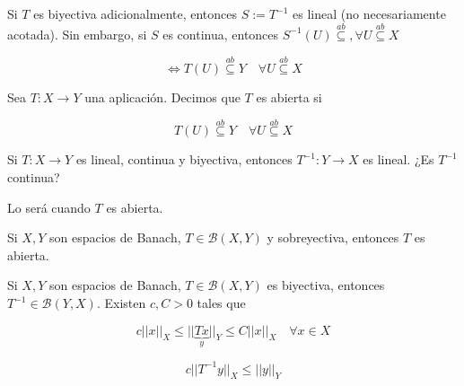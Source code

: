 Si $T$ es biyectiva adicionalmente, entonces $S:=T^{-1}$ es lineal (no necesariamente acotada).
Sin embargo, si $S$ es continua, entonces $S^{-1}(U)\overset{ab}{\subseteq},\forall U\overset{ab}{\subseteq}X$

\[\iff T(U)\overset{ab}{\subseteq}Y\quad \forall U\overset{ab}{\subseteq}X\]

\begin{fdefinition}
    Sea $T:X\to Y$ una aplicación. Decimos que $T$ es abierta si 
    
    \[T(U)\overset{ab}{\subseteq}Y\quad \forall U\overset{ab}{\subseteq}X\]
\end{fdefinition}

Si $T:X\to Y$ es lineal, continua y biyectiva, entonces $T^{-1}:Y\to X$ es lineal. ¿Es $T^{-1}$ continua?

Lo será cuando $T$ es abierta.

\begin{ftheorem}
    Si $X,Y$ son espacios de Banach, $T\in \mathcal{B}(X,Y)$ y sobreyectiva, entonces $T$ es abierta.
\end{ftheorem}

\begin{fcorollary}\label{theo:2.3.4.1}
    Si $X,Y$ son espacios de Banach, $T\in\mathcal{B}(X,Y)$ es biyectiva, entonces $T^{-1}\in\mathcal{B}(Y,X)$. Existen $c,C>0$ tales que

    \[c||x||_X\leq ||\underbrace{Tx}_{y}||_Y\leq C||x||_X\quad \forall x\in X\]

    \[c||T^{-1}y||_X\leq ||y||_Y\]
\end{fcorollary}


